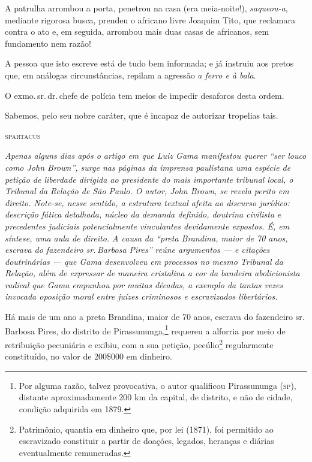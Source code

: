 A patrulha arrombou a porta, penetrou na casa (era meia-noite!),
\emph{saqueou-a}, mediante rigorosa busca, prendeu o africano livre
Joaquim Tito, que reclamara contra o ato e, em seguida, arrombou mais
duas casas de africanos, sem fundamento nem razão!

A pessoa que isto escreve está de tudo bem informada; e já instruiu aos
pretos que, em análogas circunstâncias, repilam a agressão \emph{a ferro
e à bala}.

O exmo.\,sr.\,dr.\,chefe de polícia tem meios de impedir desaforos desta
ordem.

Sabemos, pelo seu nobre caráter, que é incapaz de autorizar tropelias
tais.\medskip

\hfill\textsc{spartacus}


\begin{resumo}
\emph{Apenas alguns dias após o artigo em que Luiz Gama manifestou
querer ``ser louco como John Brown'', surge nas páginas da imprensa
paulistana uma espécie de petição de liberdade dirigida ao presidente do
mais importante tribunal local, o Tribunal da Relação de São Paulo. O
autor, John Brown, se revela perito em direito. Note-se, nesse
sentido, a estrutura textual afeita ao discurso jurídico: descrição
fática detalhada, núcleo da demanda definido, doutrina civilista e
precedentes judiciais potencialmente vinculantes devidamente expostos.
É, em síntese, uma aula de direito. A causa da ``preta Brandina, maior de
70 anos, escrava do fazendeiro sr.\,Barbosa Pires'' reúne argumentos --- e
citações doutrinárias --- que Gama desenvolveu em processos no mesmo
Tribunal da Relação, além de expressar de maneira cristalina a cor da
bandeira abolicionista radical que Gama empunhou por muitas décadas, a
exemplo da tantas vezes invocada oposição moral entre juízes criminosos
e escravizados libertários. }
\end{resumo}


Há mais de um ano a preta Brandina, maior de 70 anos, escrava do fazendeiro sr.\,Barbosa Pires, do distrito de Pirassununga,\footnote{
  Por alguma razão, talvez provocativa, o autor qualificou Pirassununga
  (\textsc{sp}), distante aproximadamente 200 km da capital, de distrito, e não
  de cidade, condição adquirida em 1879.} requereu a alforria por meio
de retribuição pecuniária e exibiu, com a sua petição, pecúlio\footnote{
  Patrimônio, quantia em dinheiro que, por lei (1871), foi permitido ao \label{peculio}
  escravizado constituir a partir de doações, legados, heranças e
  diárias eventualmente remuneradas.} regularmente constituído, no valor
de 200\$000 em dinheiro.

